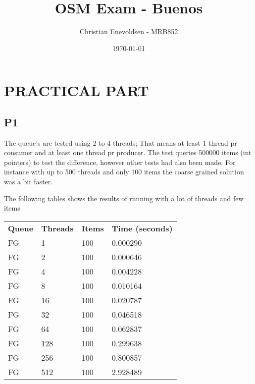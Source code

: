 \documentclass[12pt]{article}
\title{OSM Exam - Buenos}
\date{\today}
\author{Christian Enevoldsen - MRB852}
\begin{document}
\maketitle
\newpage
\tableofcontents
\newpage
\section{PRACTICAL PART}

\subsection{P1}

The queue's are tested using 2 to 4 threads; That means at least 1 thread pr consumer and at least one thread pr producer. The test queries 500000 items (int pointers) to test the difference, however other tests had also been made. For instance with up to 500 threads and only 100 items the coarse grained solution was a bit faster. 

The following tables shows the results of running with a lot of threads and few items



\begin{table}[h]
\begin{tabular}{llll}
\textbf{Queue} & \textbf{Threads} & \textbf{Items} & \textbf{Time (seconds)}\\
FG    &     1     &    100   &    0.000290 \\
FG    &     2     &    100   &    0.000646 \\
FG    &     4     &    100   &    0.004228 \\
FG    &     8     &    100   &    0.010164 \\
FG    &     16    &    100   &    0.020787 \\
FG    &     32    &    100   &    0.046518 \\
FG    &     64    &    100   &    0.062837 \\
FG    &     128   &    100   &    0.299638 \\
FG    &     256   &    100   &    0.800857 \\
FG    &     512   &    100   &    2.928489 \\
\end{tabular}
\end{table}
\end{document}
